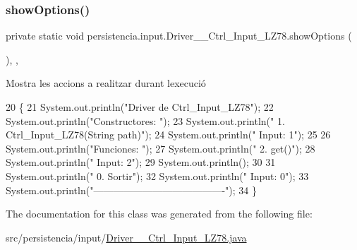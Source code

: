 \subsubsection{\texorpdfstring{show\+Options()}{showOptions()}}
{\footnotesize\ttfamily private static void persistencia.\+input.\+Driver\+\_\+\+\_\+\+Ctrl\+\_\+\+Input\+\_\+\+L\+Z78.\+show\+Options (\begin{DoxyParamCaption}{ }\end{DoxyParamCaption})\hspace{0.3cm}{\ttfamily [inline]}, {\ttfamily [static]}, {\ttfamily [private]}}



Mostra les accions a realitzar durant l\textquotesingle{}execució 


\begin{DoxyCode}
20                                      \{
21         System.out.println(\textcolor{stringliteral}{"Driver de Ctrl\_Input\_LZ78"});
22         System.out.println(\textcolor{stringliteral}{"Constructores: "});
23         System.out.println(\textcolor{stringliteral}{"     1. Ctrl\_Input\_LZ78(String path)"});
24         System.out.println(\textcolor{stringliteral}{"     Input: 1"});
25 
26         System.out.println(\textcolor{stringliteral}{"Funciones: "});
27         System.out.println(\textcolor{stringliteral}{"     2. get()"});
28         System.out.println(\textcolor{stringliteral}{"     Input: 2"});
29         System.out.println();
30 
31         System.out.println(\textcolor{stringliteral}{"     0. Sortir"});
32         System.out.println(\textcolor{stringliteral}{"     Input: 0"});
33         System.out.println(\textcolor{stringliteral}{"----------------------------------------"});
34     \}
\end{DoxyCode}


The documentation for this class was generated from the following file\+:\begin{DoxyCompactItemize}
\item 
src/persistencia/input/\hyperlink{Driver____Ctrl__Input__LZ78_8java}{Driver\+\_\+\+\_\+\+Ctrl\+\_\+\+Input\+\_\+\+L\+Z78.\+java}\end{DoxyCompactItemize}
